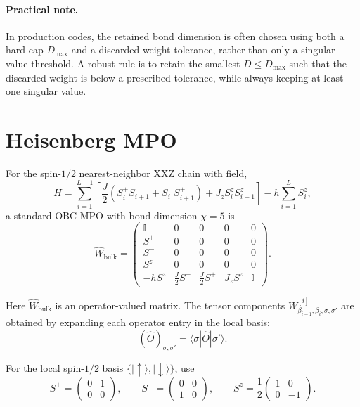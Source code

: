 \documentclass[aps,prb,onecolumn,nofootinbib]{revtex4-2}
\newcommand{\ket}[1]{|#1\rangle}
\newcommand{\bra}[1]{\langle #1|}
\newcommand{\Id}{\mathbb{I}}
\begin{document}
	\paragraph{Practical note.}
	In production codes, the retained bond dimension is often chosen using both a hard cap $D_{\max}$ and a discarded-weight tolerance, rather than only a singular-value threshold. A robust rule is to retain the smallest $D\le D_{\max}$ such that the discarded weight is below a prescribed tolerance, while always keeping at least one singular value.
	
	\section{Heisenberg MPO}
	
	For the spin-$1/2$ nearest-neighbor XXZ chain with field,
	\begin{equation}
		H =
		\sum_{i=1}^{L-1}
		\left[
		\frac{J}{2}\left(S_i^+ S_{i+1}^- + S_i^- S_{i+1}^+\right)
		+
		J_z S_i^z S_{i+1}^z
		\right]
		-
		h\sum_{i=1}^L S_i^z,
	\end{equation}
	a standard OBC MPO with bond dimension $\chi=5$ is
	\begin{equation}
		\hat W_{\mathrm{bulk}} =
		\begin{pmatrix}
			\Id & 0 & 0 & 0 & 0 \\
			S^+ & 0 & 0 & 0 & 0 \\
			S^- & 0 & 0 & 0 & 0 \\
			S^z & 0 & 0 & 0 & 0 \\
			-hS^z & \frac{J}{2}S^- & \frac{J}{2}S^+ & J_z S^z & \Id
		\end{pmatrix}.
	\end{equation}
	
	Here $\hat W_{\mathrm{bulk}}$ is an operator-valued matrix. The tensor components $W^{[i]}_{\beta_{i-1},\beta_i,\sigma,\sigma'}$ are obtained by expanding each operator entry in the local basis:
	\[
	(\hat O)_{\sigma,\sigma'} = \bra{\sigma}\hat O\ket{\sigma'}.
	\]
	
	For the local spin-$1/2$ basis $\{\ket{\uparrow},\ket{\downarrow}\}$, use
	\[
	S^+ = \begin{pmatrix}0&1\\0&0\end{pmatrix},\qquad
	S^- = \begin{pmatrix}0&0\\1&0\end{pmatrix},\qquad
	S^z = \frac12\begin{pmatrix}1&0\\0&-1\end{pmatrix}.
	\]
	
\end{document}
